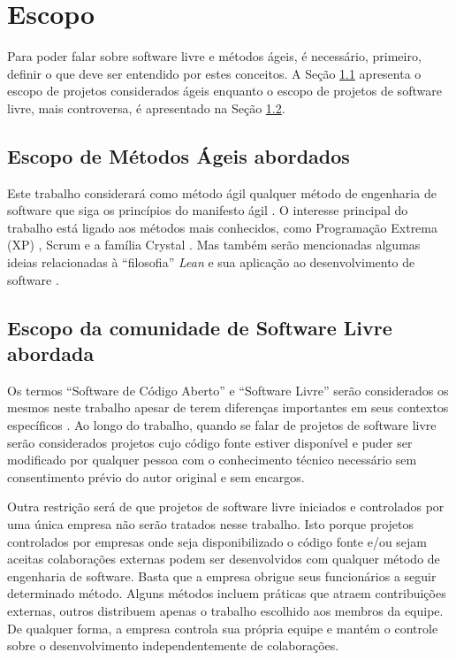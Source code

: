\chapter{Escopo}
\label{cap:escopo}

Para poder falar sobre software livre e métodos ágeis, é necessário,
primeiro, definir o que deve ser entendido por estes conceitos. A
Seção \ref{sec:agile-def} apresenta o escopo de projetos considerados
ágeis enquanto o escopo de projetos de software livre, mais
controversa, é apresentado na Seção \ref{sec:os-def}.

\section{Escopo de Métodos Ágeis abordados}
\label{sec:agile-def}

Este trabalho considerará como método ágil qualquer método de
engenharia de software que siga os princípios do manifesto ágil
\cite{AgileManifesto}. O interesse principal do trabalho está ligado
aos métodos mais conhecidos, como Programação Extrema (XP)
\cite{XP02}, Scrum \cite{Schwaber2004} e a família Crystal
\cite{Cockburn2002}. Mas também serão mencionadas algumas ideias
relacionadas à ``filosofia'' \emph{Lean} \cite{Ohno1998} e sua
aplicação ao desenvolvimento de software \cite{Poppendieck2005}.

\section{Escopo da comunidade de Software Livre abordada}
\label{sec:os-def}

Os termos ``Software de Código Aberto'' e ``Software Livre'' serão
considerados os mesmos neste trabalho apesar de terem diferenças
importantes em seus contextos específicos \cite[Ch. 1, Free Versus
Open source]{Fogel2005}. Ao longo do trabalho, quando se falar de
projetos de software livre serão considerados projetos cujo código
fonte estiver disponível e puder ser modificado por qualquer pessoa
com o conhecimento técnico necessário sem consentimento prévio do
autor original e sem encargos.

Outra restrição será de que projetos de software livre iniciados e
controlados por uma única empresa não serão tratados nesse
trabalho. Isto porque projetos controlados por empresas onde seja
disponibilizado o código fonte e/ou sejam aceitas colaborações
externas podem ser desenvolvidos com qualquer método de engenharia de
software. Basta que a empresa obrigue seus funcionários a seguir
determinado método. Alguns métodos incluem práticas que atraem
contribuições externas, outros distribuem apenas o trabalho escolhido
aos membros da equipe. De qualquer forma, a empresa controla sua
própria equipe e mantém o controle sobre o desenvolvimento
independentemente de colaborações.

